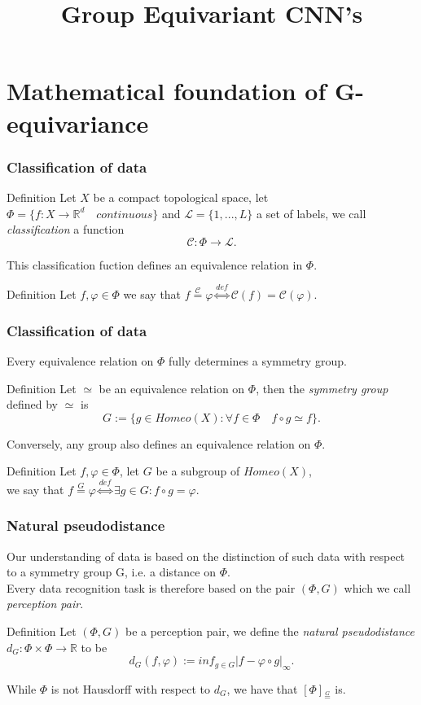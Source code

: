 \documentclass{beamer}
\title{Group Equivariant CNN's}
\newcommand{\R}{\mathbb{R}}
\newcommand{\mc}[1]{\mathcal{#1}}
\newcommand{\ii}[1]{\textit{#1}}
\newcommand{\req}[1]{\stackrel{#1}{=}}
\begin{document}
\frame{\titlepage}
\section{Mathematical foundation of G-equivariance}
\begin{frame}
\frametitle{Classification of data}
    \begin{block}{Definition}
        Let $X$ be a compact topological space, let $\Phi = \{ f : X \to \R^d \quad continuous \}$ and
        $\mc{L} = \{1,...,L\}$ a set of labels, we call \ii{classification} a function
        \[ \mc{C}: \Phi \to \mc{L}. \]
    \end{block}
    This classification fuction defines an equivalence relation in $\Phi$.
    \begin{block}{Definition}
        Let $f,\varphi \in \Phi$ we say that $f \req{\mc{C}} \varphi \stackrel{def}{\iff} \mc{C}(f) = \mc{C}(\varphi)$.
    \end{block}
\end{frame}

\begin{frame}
    \frametitle{Classification of data}
        Every equivalence relation on $\Phi$ fully determines a symmetry group.
        \begin{block}{Definition}
            Let $\simeq$ be an equivalence relation on $\Phi$, then the \ii{symmetry group} defined by $\simeq$ is 
            \[ G := \{ g \in Homeo(X) : \forall f \in \Phi \quad f \circ g \simeq f \}. \]
        \end{block}
        Conversely, any group also defines an equivalence relation on $\Phi$.
        \begin{block}{Definition}
            Let $f,\varphi \in \Phi$, let $G$ be a subgroup of $Homeo(X)$,\\
            we say that $f \req{G} \varphi \stackrel{def}{\iff} \exists g \in G : f \circ g = \varphi$.
        \end{block}
    \end{frame}

\begin{frame}
    \frametitle{Natural pseudodistance}
    Our understanding of data is based on the distinction of such data with respect to a symmetry group G, i.e. a distance on $\Phi$.\\
    Every data recognition task is therefore based on the pair $(\Phi,G)$ which we call \ii{perception pair}.
    \begin{block}{Definition}
        Let $(\Phi,G)$ be a perception pair, we define the \ii{natural pseudodistance} $d_G : \Phi \times \Phi \to \R$ to be 
        \[ d_G(f,\varphi) := inf_{g \in G} |f - \varphi \circ g|_{\infty}. \]
    \end{block}
    While $\Phi$ is not Hausdorff with respect to $d_G$, we have that $[\Phi]_{\req{G}}$ is.
\end{frame}
\end{document}
